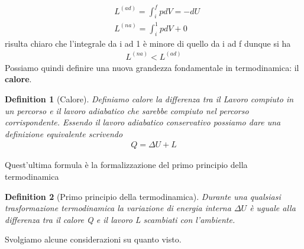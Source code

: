 \documentclass[10pt,a4paper]{article}
\newtheorem{definition}{Definition}
\begin{document}
\begin{align*} 
&L^{(ad)} = \int_{i}^{f} p dV = -dU\\
&L^{(na)} = \int_{i}^{1}pdV+0
\end{align*} 
risulta chiaro che l'integrale da i ad 1 è minore di quello da i ad f dunque si ha
\begin{align*} 
	L^{(na)}<L^{(ad)}
\end{align*} 
Possiamo quindi definire una nuova grandezza fondamentale in termodinamica: il \textbf{calore}.
\begin{definition}[Calore]
	Definiamo calore la differenza tra il Lavoro compiuto in un percorso e il lavoro adiabatico che sarebbe compiuto nel percorso corrispondente. Essendo il lavoro adiabatico conservativo possiamo dare una definizione equivalente scrivendo
	\begin{align*} 
		Q = \Delta U + L
	\end{align*} 
\end{definition}
Quest'ultima formula è la formalizzazione del primo principio della termodinamica
\begin{definition}[Primo principio della termodinamica]
	Durante una qualsiasi trasformazione termodinamica la variazione di energia interna $\Delta U$ è uguale alla differenza tra il calore Q e il lavoro L scambiati con l'ambiente. 
\end{definition}
Svolgiamo alcune considerazioni su quanto visto.
\end{document}
